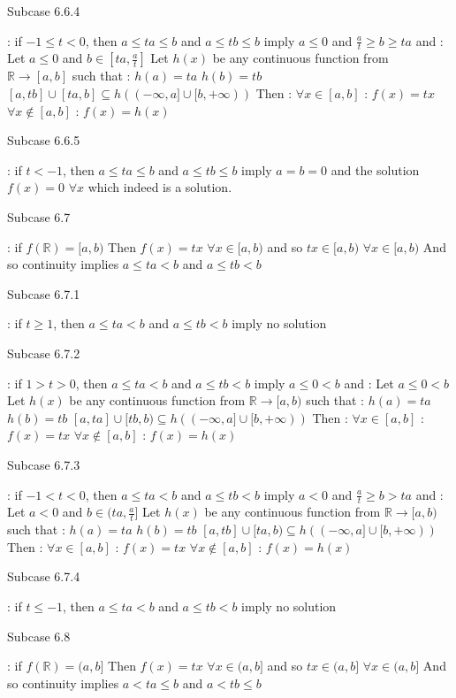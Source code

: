 \begin{solution}
\begin{bolded}Subcase 6.6.4\end{bolded} : if $-1\le t<0$, then $a\le ta\le b$ and $a\le tb\le b$ imply $a\le 0$ and $\frac at\ge b\ge ta$ and :
Let $a\le 0$ and $b\in[ta,\frac at]$
Let $h(x)$ be any continuous function from $\mathbb R\to[a,b]$ such that :
$h(a)=ta$
$h(b)=tb$
$[a,tb]\cup[ta,b]\subseteq h((-\infty,a]\cup[b,+\infty))$
Then :
$\forall x\in[a,b]$ : $f(x)=tx$
$\forall x\notin[a,b]$ : $f(x)=h(x)$

\begin{bolded}Subcase 6.6.5 \end{bolded}: if $t<-1$, then $a\le ta\le b$ and $a\le tb\le b$ imply $a=b=0$ and the solution $f(x)=0$ $\forall x$ which indeed is a solution.

\begin{bolded}Subcase 6.7\end{bolded} : if $f(\mathbb R)=[a,b)$
Then $f(x)=tx$ $\forall x\in [a,b)$ and so $tx\in[a,b)$ $\forall x\in[a,b)$
And so continuity implies $a\le ta< b$ and $a\le tb< b$

\begin{bolded}Subcase 6.7.1\end{bolded} : if $t\ge 1$, then $a\le ta< b$ and $a\le tb< b$ imply no solution

\begin{bolded}Subcase 6.7.2\end{bolded} : if $1>t>0$, then $a\le ta< b$ and $a\le tb< b$ imply $a\le 0< b$ and :
Let $a\le 0< b$
Let $h(x)$ be any continuous function from $\mathbb R\to[a,b)$ such that :
$h(a)=ta$
$h(b)=tb$
$[a,ta]\cup[tb,b)\subseteq h((-\infty,a]\cup[b,+\infty))$
Then :
$\forall x\in[a,b]$ : $f(x)=tx$
$\forall x\notin[a,b]$ : $f(x)=h(x)$

\begin{bolded}Subcase 6.7.3\end{bolded} : if $-1< t<0$, then $a\le ta< b$ and $a\le tb< b$ imply $a<0$ and $\frac at\ge b> ta$ and :
Let $a<0$ and $b\in(ta,\frac at]$
Let $h(x)$ be any continuous function from $\mathbb R\to[a,b)$ such that :
$h(a)=ta$
$h(b)=tb$
$[a,tb]\cup[ta,b)\subseteq h((-\infty,a]\cup[b,+\infty))$
Then :
$\forall x\in[a,b]$ : $f(x)=tx$
$\forall x\notin[a,b]$ : $f(x)=h(x)$

\begin{bolded}Subcase 6.7.4\end{bolded} : if $t\le -1$, then $a\le ta< b$ and $a\le tb< b$ imply no solution

\begin{bolded}Subcase 6.8\end{bolded} : if $f(\mathbb R)=(a,b]$
Then $f(x)=tx$ $\forall x\in (a,b]$ and so $tx\in(a,b]$ $\forall x\in(a,b]$
And so continuity implies $a< ta\le b$ and $a< tb\le b$


\end{solution}
